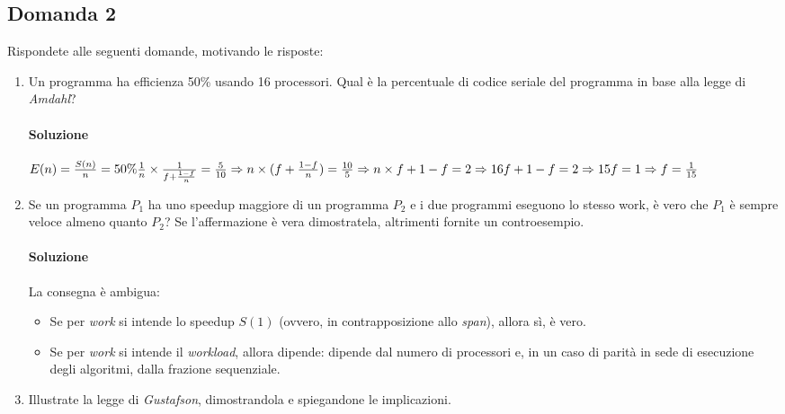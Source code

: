 \newpage

\subsection{Domanda 2}
Rispondete alle seguenti domande, motivando le risposte:
\begin{enumerate}
	\item Un programma ha efficienza 50\% usando 16 processori. Qual è la percentuale di codice seriale del programma in base alla legge di \textit{Amdahl}?
	\paragraph{Soluzione}
	$E(n) = \frac{S(n)}{n} = 50\% \\ \frac{1}{n}\times \frac{1}{f+\frac{1-f}{n}} = \frac{5}{10} \Rightarrow n\times (f + \frac{1-f}{n}) = \frac{10}{5} \Rightarrow n\times f + 1 - f = 2 \Rightarrow 16f + 1 - f = 2 \Rightarrow 15f = 1 \Rightarrow f = \frac{1}{15}$
	\item Se un programma $P_1$ ha uno speedup maggiore di un programma $P_2$ e i due programmi eseguono lo stesso work, è vero che $P_1$ è sempre veloce almeno quanto $P_2$? Se l'affermazione è vera dimostratela, altrimenti fornite un controesempio.
	\paragraph{Soluzione}
	La consegna è ambigua:
	\begin{itemize}
		\item Se per \textit{work} si intende lo speedup $S(1)$ (ovvero, in contrapposizione allo \textit{span}), allora s\`i, \`e vero.
		\item Se per \textit{work} si intende il \textit{workload}, allora dipende: dipende dal numero di processori e, in un caso di parit\`a in sede di esecuzione degli algoritmi, dalla frazione sequenziale.
	\end{itemize}
	\item Illustrate la legge di \textit{Gustafson}, dimostrandola e spiegandone le implicazioni.

\end{enumerate}
